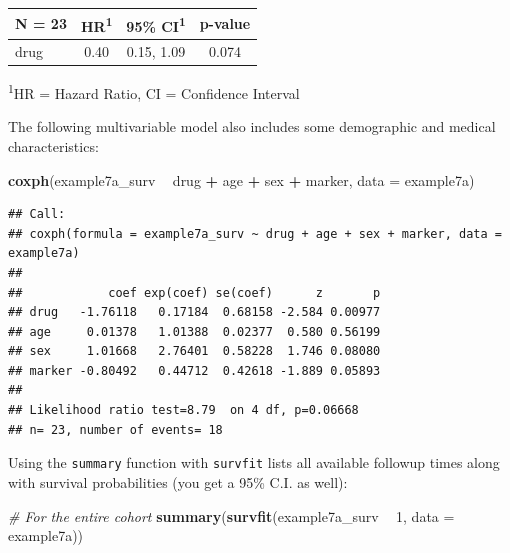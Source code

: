 \documentclass[]{book}
\newenvironment{Shaded}{\begin{snugshade}}{\end{snugshade}}
\newcommand{\CommentTok}[1]{\textcolor[rgb]{0.56,0.35,0.01}{\textit{#1}}}
\newcommand{\DataTypeTok}[1]{\textcolor[rgb]{0.13,0.29,0.53}{#1}}
\newcommand{\DecValTok}[1]{\textcolor[rgb]{0.00,0.00,0.81}{#1}}
\newcommand{\KeywordTok}[1]{\textcolor[rgb]{0.13,0.29,0.53}{\textbf{#1}}}
\newcommand{\NormalTok}[1]{#1}
\newcommand{\OperatorTok}[1]{\textcolor[rgb]{0.81,0.36,0.00}{\textbf{#1}}}
\newcommand{\StringTok}[1]{\textcolor[rgb]{0.31,0.60,0.02}{#1}}
\begin{document}
\captionsetup[table]{labelformat=empty,skip=1pt}
\begin{longtable}{lccc}
\toprule
\textbf{N = 23} & \textbf{HR}\textsuperscript{1} & \textbf{95\% CI}\textsuperscript{1} & \textbf{p-value} \\ 
\midrule
drug & 0.40 & 0.15, 1.09 & 0.074 \\ 
\bottomrule
\end{longtable}
\vspace{-5mm}
\begin{minipage}{\linewidth}
\textsuperscript{1}HR = Hazard Ratio, CI = Confidence Interval \\ 
\end{minipage}

The following multivariable model also includes some demographic and
medical characteristics:

\begin{Shaded}
\begin{Highlighting}[]
\KeywordTok{coxph}\NormalTok{(example7a_surv }\OperatorTok{~}\StringTok{ }\NormalTok{drug }\OperatorTok{+}\StringTok{ }\NormalTok{age }\OperatorTok{+}\StringTok{ }\NormalTok{sex }\OperatorTok{+}\StringTok{ }\NormalTok{marker, }\DataTypeTok{data =}\NormalTok{ example7a)}
\end{Highlighting}
\end{Shaded}

\begin{verbatim}
## Call:
## coxph(formula = example7a_surv ~ drug + age + sex + marker, data = example7a)
## 
##            coef exp(coef) se(coef)      z       p
## drug   -1.76118   0.17184  0.68158 -2.584 0.00977
## age     0.01378   1.01388  0.02377  0.580 0.56199
## sex     1.01668   2.76401  0.58228  1.746 0.08080
## marker -0.80492   0.44712  0.42618 -1.889 0.05893
## 
## Likelihood ratio test=8.79  on 4 df, p=0.06668
## n= 23, number of events= 18
\end{verbatim}

Using the \texttt{summary} function with \texttt{survfit} lists all
available followup times along with survival probabilities (you get a
95\% C.I. as well):

\begin{Shaded}
\begin{Highlighting}[]
\CommentTok{# For the entire cohort}
\KeywordTok{summary}\NormalTok{(}\KeywordTok{survfit}\NormalTok{(example7a_surv }\OperatorTok{~}\StringTok{ }\DecValTok{1}\NormalTok{, }\DataTypeTok{data =}\NormalTok{ example7a))}
\end{Highlighting}
\end{Shaded}
\end{document}

